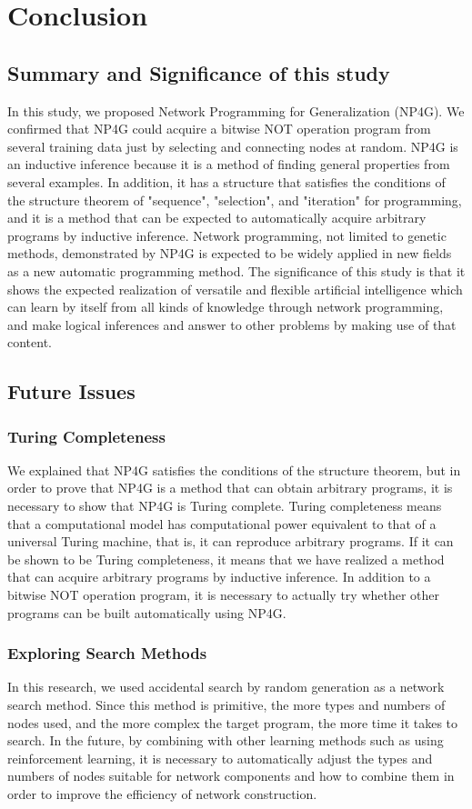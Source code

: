 \documentclass{article}
\begin{document}
\section {Conclusion}
\subsection {Summary and Significance of this study}
In this study, we proposed Network Programming for Generalization (NP4G).
We confirmed that NP4G could acquire a bitwise NOT operation program from several training data just by selecting and connecting nodes at random.
NP4G is an inductive inference because it is a method of finding general properties from several examples.
In addition, it has a structure that satisfies the conditions of the structure theorem of "sequence", "selection", and "iteration" for programming, and it is a method that can be expected to automatically acquire arbitrary programs by inductive inference.
Network programming, not limited to genetic methods, demonstrated by NP4G is expected to be widely applied in new fields as a new automatic programming method.
The significance of this study is that it shows the expected realization of versatile and flexible artificial intelligence which can learn by itself from all kinds of knowledge through network programming, and make logical inferences and answer to other problems by making use of that content.

\subsection {Future Issues}
\subsubsection {Turing Completeness}
We explained that NP4G satisfies the conditions of the structure theorem, but in order to prove that NP4G is a method that can obtain arbitrary programs, it is necessary to show that NP4G is Turing complete.
Turing completeness means that a computational model has computational power equivalent to that of a universal Turing machine, that is, it can reproduce arbitrary programs.
If it can be shown to be Turing completeness, it means that we have realized a method that can acquire arbitrary programs by inductive inference.
In addition to a bitwise NOT operation program, it is necessary to actually try whether other programs can be built automatically using NP4G.

\subsubsection {Exploring Search Methods}
In this research, we used accidental search by random generation as a network search method.
Since this method is primitive, the more types and numbers of nodes used, and the more complex the target program, the more time it takes to search.
In the future, by combining with other learning methods such as using reinforcement learning, it is necessary to automatically adjust the types and numbers of nodes suitable for network components and how to combine them in order to improve the efficiency of network construction.
\end{document}
